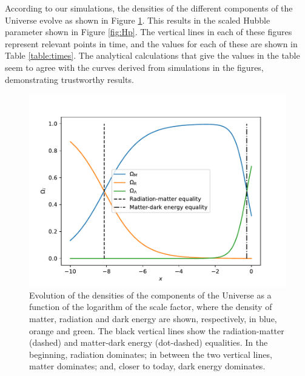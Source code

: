 \documentclass{aa}
\begin{document}
According to our simulations, the densities of the different components of the Universe evolve as shown in Figure \ref{fig:Omegas}. This results in the scaled Hubble parameter shown in Figure \ref{fig:Hp}. The vertical lines in each of these figures represent relevant points in time, and the values for each of these are shown in Table \ref{table:times}. The analytical calculations that give the values in the table seem to agree with the curves derived from simulations in the figures, demonstrating trustworthy results.

\begin{figure}[ht]
\centering
\includegraphics[width=\hsize]{figures/Omegas.pdf}
  \caption{Evolution of the densities of the components of the Universe as a function of the logarithm of the scale factor, where the density of matter, radiation and dark energy are shown, respectively, in blue, orange and green. The black vertical lines show the radiation-matter (dashed) and matter-dark energy (dot-dashed) equalities. In the beginning, radiation dominates; in between the two vertical lines, matter dominates; and, closer to today, dark energy dominates.}
     \label{fig:Omegas}
\end{figure}
\end{document}
